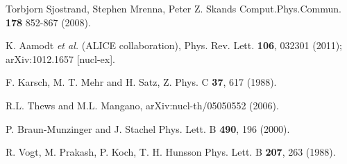 \documentclass[aps,prc,preprint,superscriptaddress,showpacs,showkeys]{revtex4-1}
\begin{document}
\begin{thebibliography}{100}
 Torbjorn Sjostrand, Stephen Mrenna, Peter Z. Skands Comput.Phys.Commun. {\bf 178} 852-867 (2008).

 K. Aamodt {\it et al.} (ALICE collaboration), Phys. Rev. Lett. {\bf 106}, 032301 (2011); arXiv:1012.1657 [nucl-ex].

 F. Karsch, M. T. Mehr and H. Satz, Z. Phys. C {\bf 37}, 617 (1988).

 R.L. Thews and M.L. Mangano, arXiv:nucl-th/05050552 (2006).

 P. Braun-Munzinger and J. Stachel Phys. Lett. B {\bf 490}, 196 (2000).


 R. Vogt, M. Prakash, P. Koch, T. H. Hunsson Phys. Lett. B {\bf 207}, 263 (1988). 
\end{thebibliography}
\end{document}
